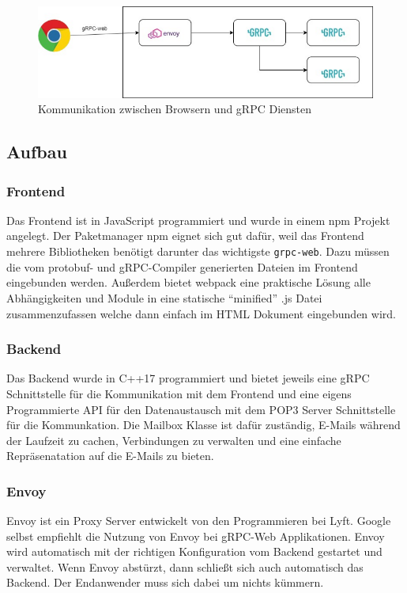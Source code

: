 \documentclass[12pt]{article}
\def\code#1{\texttt{#1}}
\begin{document}
\begin{figure}[htbp]
    \centering
    \includegraphics[scale=0.55]{grpc-web_communicaton}
    \caption{Kommunikation zwischen Browsern und gRPC Diensten \cite{abb1}}
    \label{fig:situation1}
\end{figure}
\FloatBarrier

\subsection{Aufbau}
\subsubsection{Frontend}
Das Frontend ist in JavaScript programmiert und wurde in einem npm Projekt
angelegt. Der Paketmanager npm eignet sich gut dafür, weil das Frontend mehrere
Bibliotheken benötigt darunter das wichtigste \code{grpc-web}. Dazu müssen
die vom protobuf- und gRPC-Compiler generierten Dateien im Frontend eingebunden
werden. Außerdem bietet webpack \cite{webpack} eine praktische Lösung alle 
Abhängigkeiten und Module in eine statische "`minified"' .js Datei 
zusammenzufassen welche dann einfach im HTML Dokument eingebunden wird.

\subsubsection{Backend}
Das Backend wurde in C++17 programmiert und bietet jeweils eine gRPC 
Schnittstelle für die Kommunikation mit dem Frontend und eine eigens
Programmierte API für den Datenaustausch mit dem POP3 Server Schnittstelle für 
die Kommunkation. Die Mailbox Klasse ist dafür zuständig, E-Mails während der
Laufzeit zu cachen, Verbindungen zu verwalten und eine einfache Repräsenatation
auf die E-Mails zu bieten.

\subsubsection{Envoy}
Envoy ist ein Proxy Server entwickelt von den Programmieren bei Lyft. Google 
selbst empfiehlt die Nutzung von Envoy bei gRPC-Web Applikationen. Envoy wird 
automatisch mit der richtigen Konfiguration vom Backend gestartet und 
verwaltet. Wenn Envoy abstürzt, dann schließt sich auch automatisch das 
Backend. Der Endanwender muss sich dabei um nichts kümmern.
\end{document}
